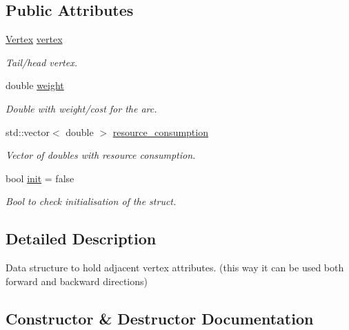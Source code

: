 \subsection*{Public Attributes}
\begin{DoxyCompactItemize}
\item 
\hyperlink{structbidirectional_1_1Vertex}{Vertex} \hyperlink{structbidirectional_1_1AdjVertex_afd878dad03f7f4437cb135fc4f00c46c}{vertex}
\begin{DoxyCompactList}\small\item\em Tail/head vertex. \end{DoxyCompactList}\item 
double \hyperlink{structbidirectional_1_1AdjVertex_a416d2c737409cf4ed7d7494508f3a7de}{weight}
\begin{DoxyCompactList}\small\item\em Double with weight/cost for the arc. \end{DoxyCompactList}\item 
std\+::vector$<$ double $>$ \hyperlink{structbidirectional_1_1AdjVertex_a3755b5ef7a009834706922a54d115927}{resource\+\_\+consumption}
\begin{DoxyCompactList}\small\item\em Vector of doubles with resource consumption. \end{DoxyCompactList}\item 
bool \hyperlink{structbidirectional_1_1AdjVertex_abf769818349400a6598021c1bed78045}{init} = false
\begin{DoxyCompactList}\small\item\em Bool to check initialisation of the struct. \end{DoxyCompactList}\end{DoxyCompactItemize}


\subsection{Detailed Description}
Data structure to hold adjacent vertex attributes. (this way it can be used both forward and backward directions) 

\subsection{Constructor \& Destructor Documentation}
\mbox{\label{structbidirectional_1_1AdjVertex_ad199785e49b89a8066b7a4e73d6d9f5a}} 
